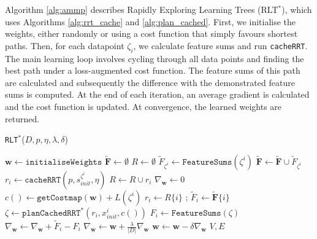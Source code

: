 \documentclass[a4paper,11pt]{report}
\begin{document}
Algorithm \ref{alg:ammp} describes Rapidly Exploring Learning Trees (RLT$^*$), which uses  Algorithms \ref{alg:rrt_cache} and \ref{alg:plan_cached}. First, we initialise the weights, either randomly or using a cost function that simply favours shortest paths. Then, for each datapoint $\zeta_i$, we calculate feature sums and run \texttt{cacheRRT}. The main learning loop involves cycling through all data points and finding the best path under a loss-augmented cost function. The feature sums of this path are calculated and subsequently the difference with the demonstrated feature sums is computed. At the end of each iteration, an average gradient is calculated and the cost function is updated. At convergence, the learned weights are returned.

	\begin{algorithm}
  	\scriptsize
	\caption{\texttt{RLT$^*$}($D,p,\eta,\lambda,\delta$)\label{alg:ammp}}
	\begin{algorithmic}[1]
	\STATE $\mathbf{w} \gets \texttt{initialiseWeights}$
	\STATE $\mathbf{\tilde{F}} \gets \emptyset$
	\STATE $R \gets \emptyset$
	\STATE $\tilde{F}_{\zeta^i} \gets \texttt{FeatureSums}(\zeta^i)$
	\STATE $\mathbf{\tilde{F}} \gets \mathbf{\tilde{F}} \cup \tilde{F}_{\zeta^i}$
	\STATE $r_i \gets \texttt{cacheRRT}(p,s_{init}^{\zeta^i},\eta)$
	\STATE $R \gets R \cup r_i $
	\ENDFOR
	\REPEAT
	\STATE $\nabla_{\mathbf{w}}\gets 0$
	\STATE $c() \gets \texttt{getCostmap}(\mathbf{w}) + L(\zeta^i)$ 
	\STATE $r_i \gets R\{i\}$ ;	$\tilde{F}_i \gets \mathbf{\tilde{F}}\{i\}$ 
	\STATE $\zeta \gets \texttt{planCachedRRT}^*(r_i,x^i_{init},c())$
	\STATE $F_i \gets \texttt{FeatureSums}(\zeta)$
	\STATE $\nabla_{\mathbf{w}} \gets \nabla_{\mathbf{w}} + \tilde{F}_i - F_i $
	\ENDFOR
	\STATE $\nabla_{\mathbf{w}} \gets \mathbf{w} + \frac{\lambda}{|D|}\nabla_{\mathbf{w}} $
	\STATE $\mathbf{w} \gets \mathbf{w} - \delta\nabla_{\mathbf{w}} $
	\RETURN $V,E$

	\end{algorithmic}
	\end{algorithm}

\end{document}
